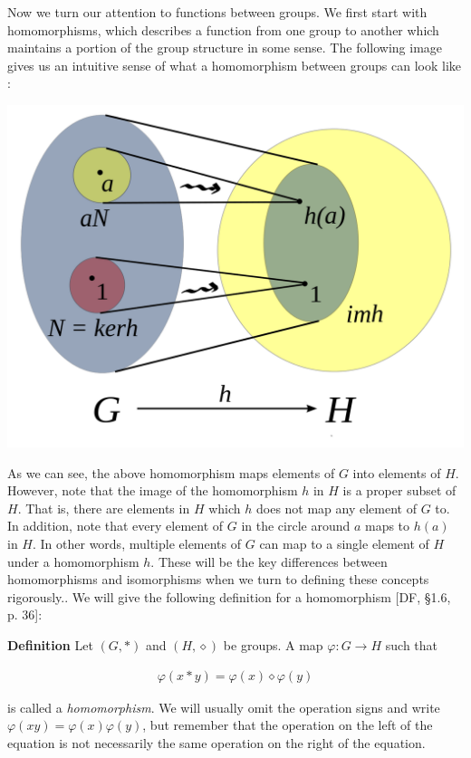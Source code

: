 \documentclass[11pt, reqno]{amsart}
\theoremstyle{plain}
\theoremstyle{definition}
\theoremstyle{example}
\begin{document}
\par
Now we turn our attention to functions between groups. We first start with homomorphisms, which describes a function from one group to another which maintains a portion of the group structure in some sense. The following image gives us an intuitive sense of what a homomorphism between groups can look like \cite{homomorphismwiki}:

\includegraphics[scale=0.25]{homomorphism}

\par
As we can see, the above homomorphism maps elements of $G$ into elements of $H$. However, note that the image of the homomorphism $h$ in $H$ is a proper subset of $H$. That is, there are elements in $H$ which $h$ does not map any element of $G$ to. In addition, note that every element of $G$ in the circle around $a$ maps to $h(a)$ in $H$. In other words, multiple elements of $G$ can map to a single element of $H$ under a homomorphism $h$. These will be the key differences between homomorphisms and isomorphisms when we turn to defining these concepts rigorously.. We will give the following definition for a homomorphism [DF, \S 1.6, p. 36]:

\par
\textbf{Definition} Let $(G, *)$ and $(H, \diamond)$ be groups. A map $\varphi: G \to H$ such that 

\begin{align*}
\varphi(x * y) = \varphi(x) \diamond \varphi(y)
\end{align*}

is called a \textit{homomorphism}. We will usually omit the operation signs and write $\varphi(xy) = \varphi(x)\varphi(y)$, but remember that the operation on the left of the equation is not necessarily the same operation on the right of the equation.
\end{document}
